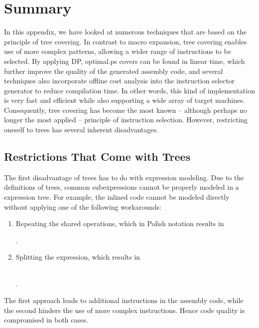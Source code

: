 \section{Summary}

In this appendix, we have looked at numerous techniques that are based on the
\gls{principle} of \gls{tree covering}.
%
In contrast to \gls{macro expansion}, \gls{tree covering} enables use of more
complex \glspl{pattern}, allowing a wider range of \glspl{instruction} to be
selected.
%
By applying \glsdesc{DP}, \gls{optimal.ps} covers can be found in linear time,
which further improve the quality of the generated \gls{assembly code}, and
several techniques also incorporate \gls{offline cost analysis} into the
\gls{instruction selector} generator to reduce compilation time.
%
In other words, this kind of implementation is very fast and efficient while
also supporting a wide array of \glspl{target machine}.
%
Consequently, \gls{tree covering} has become the most known -- although perhaps
no longer the most applied -- \gls{principle} of \gls{instruction selection}.
%
However, restricting oneself to \glspl{tree} has several inherent disadvantages.


\subsection{Restrictions That Come with Trees}

%
%
%
%
The first disadvantage of \glspl{tree} has to do with expression modeling.
%
Due to the definitions of \glspl{tree}, common subexpressions cannot be properly
modeled in a \gls{expression tree}.
%
For example, the inlined code cannot be modeled directly without applying one of
the following workarounds:
%
\begin{enumerate}
  \item Repeating the shared operations, which in \gls{Polish notation} results
    in
    \begin{center}
      .
    \end{center}
  \item Splitting the expression, which results in
    \begin{center}
      \\
      .
    \end{center}
\end{enumerate}
%
The first approach leads to additional \glspl{instruction} in the \gls{assembly
  code}, while the second hinders the use of more complex \glspl{instruction}.
%
Hence code quality is compromised in both cases.

